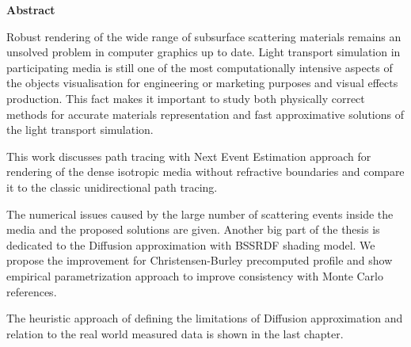 
\clearemptydoublepage
{}
{}

\vspace*{2cm}
\begin{center}
{\Large \textbf{Abstract}}
\end{center}
\vspace{1cm}

Robust rendering of the wide range of subsurface scattering materials remains an unsolved problem in
computer graphics up to date. Light transport simulation in participating media is still one of the
most computationally intensive aspects of the objects visualisation for engineering or marketing
purposes and visual effects production. This fact makes it important to study both physically
correct methods for accurate materials representation and fast approximative solutions of the light
transport simulation.

This work discusses path tracing with Next Event Estimation approach for rendering of the dense
isotropic media without refractive boundaries and compare it to the classic unidirectional path
tracing.

The numerical issues caused by the large number of scattering events inside the media and the
proposed solutions are given. Another big part of the thesis is dedicated to the Diffusion
approximation with BSSRDF shading model. We propose the improvement for Christensen-Burley
precomputed profile and show empirical parametrization approach to improve consistency with Monte
Carlo references.

The heuristic approach of defining the limitations of Diffusion approximation and relation to the
real world measured data is shown in the last chapter.
